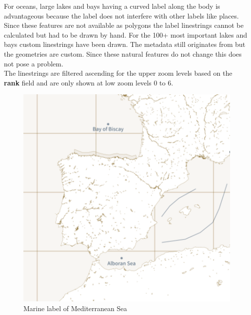 \noindent\begin{minipage}[t]{0.48\linewidth}
    \vspace{0pt}
    For oceans, large lakes and bays having a curved label along the body is advantageous because the label does not interfere with other labels like places.
    \\
    Since these features are not available as polygons the label linestrings cannot be calculated but had to be drawn by hand. For the 100+ most important lakes and bays custom linestrings have been drawn. The metadata still originates from \osm{} but the geometries are custom. Since these natural features do not change this does not pose a problem. 
    \\
    The linestrings are filtered ascending for the upper zoom levels based on the \textbf{rank} field and are only shown at low zoom levels 0 to 6.
\end{minipage}
\hfill
\begin{minipage}[t]{0.48\linewidth}
    \vspace{-15pt}
    \begin{figure}[H]
      \includegraphics[width=1\textwidth]{images/schema/marine_label_example}
      \caption{Marine label of Mediterranean Sea}
    \end{figure}
\end{minipage}

